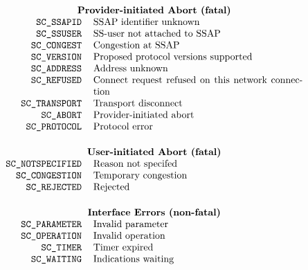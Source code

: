 
\normalsize
\[\begin{tabular}{rp{3.0in}}
	\multicolumn{2}{c}{\bf Provider-initiated Abort (fatal)}\\
\tt SC\_SSAPID&		SSAP identifier unknown\\
\tt SC\_SSUSER&		SS-user not attached to SSAP\\
\tt SC\_CONGEST&	Congestion at SSAP\\
\tt SC\_VERSION&	Proposed protocol versions supported\\
\tt SC\_ADDRESS&	Address unknown\\
\tt SC\_REFUSED&	Connect request refused on this network connection\\
\tt SC\_TRANSPORT&	Transport disconnect\\
\tt SC\_ABORT&		Provider-initiated abort\\
\tt SC\_PROTOCOL&	Protocol error\\[0.2in]
	\multicolumn{2}{c}{\bf User-initiated Abort (fatal)}\\
\tt SC\_NOTSPECIFIED&	Reason not specifed\\
\tt SC\_CONGESTION&	Temporary congestion\\
\tt SC\_REJECTED&	Rejected\\[0.2in]
	\multicolumn{2}{c}{\bf Interface Errors (non-fatal)}\\
\tt SC\_PARAMETER&	Invalid parameter\\
\tt SC\_OPERATION&	Invalid operation\\
\tt SC\_TIMER&		Timer expired\\
\tt SC\_WAITING&	Indications waiting
\end{tabular}\]
